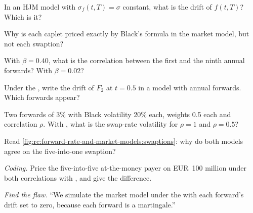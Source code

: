 \begin{exercise}[$\star$]\label{exo:rc:forward-rate-and-market-models:1}
In an HJM model with $\sigma_f(t,T)=\sigma$ constant, what is the drift of $f(t,T)$?
Which  is it?
\end{exercise}

\begin{exercise}[$\star$]\label{exo:rc:forward-rate-and-market-models:2}
Why is each caplet priced exactly by Black's formula in the market model, but
not each swaption?
\end{exercise}

\begin{exercise}[$\star$]\label{exo:rc:forward-rate-and-market-models:3}
With $\beta = 0.40$, what is the correlation between the first and the ninth annual
forwards? With $\beta=0.02$?
\end{exercise}

\begin{exercise}[$\star\star$]\label{exo:rc:forward-rate-and-market-models:4}
Under the , write the drift of $F_2$ at $t=0.5$ in a model with annual
forwards. Which forwards appear?
\end{exercise}

\begin{exercise}[$\star\star$]\label{exo:rc:forward-rate-and-market-models:5}
Two forwards of 3\% with Black volatility 20\% each, weights 0.5 each and
correlation $\rho$. With , what is the swap-rate volatility for
$\rho=1$ and $\rho=0.5$?
\end{exercise}

\begin{exercise}[$\star\star$]\label{exo:rc:forward-rate-and-market-models:6}
Read \cref{fig:rc:forward-rate-and-market-models:swaptions}: why do both models
agree on the five-into-one swaption?
\end{exercise}

\begin{exercise}[$\star\star\star$]\label{exo:rc:forward-rate-and-market-models:7}
\emph{Coding.} Price the five-into-five at-the-money payer on EUR~100 million under
both correlations with , and give the difference.
\end{exercise}

\begin{exercise}[$\star\star\star$]\label{exo:rc:forward-rate-and-market-models:8}
\emph{Find the flaw.} ``We simulate the market model under the  with
each forward's drift set to zero, because each forward is a martingale.''
\end{exercise}

